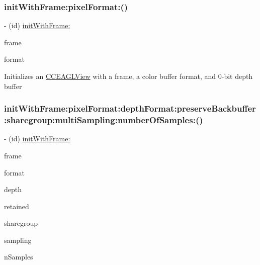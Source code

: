 \subsubsection{\texorpdfstring{init\+With\+Frame\+:pixel\+Format\+:()}{initWithFrame:pixelFormat:()}\hspace{0.1cm}{\footnotesize\ttfamily [2/2]}}
{\footnotesize\ttfamily -\/ (id) \hyperlink{interfaceCCEAGLView_a7d569f8fad8006eaa02d9b60f3877e43}{init\+With\+Frame\+:} \begin{DoxyParamCaption}\item[{(C\+G\+Rect)}]{frame }\item[{pixelFormat:(N\+S\+String $\ast$)}]{format }\end{DoxyParamCaption}}

Initializes an \hyperlink{interfaceCCEAGLView}{C\+C\+E\+A\+G\+L\+View} with a frame, a color buffer format, and 0-\/bit depth buffer \mbox{\label{interfaceCCEAGLView_adaca2cf585c2dc4881a07bc78a0fad61}} 
\subsubsection{\texorpdfstring{init\+With\+Frame\+:pixel\+Format\+:depth\+Format\+:preserve\+Backbuffer\+:sharegroup\+:multi\+Sampling\+:number\+Of\+Samples\+:()}{initWithFrame:pixelFormat:depthFormat:preserveBackbuffer:sharegroup:multiSampling:numberOfSamples:()}\hspace{0.1cm}{\footnotesize\ttfamily [1/2]}}
{\footnotesize\ttfamily -\/ (id) \hyperlink{interfaceCCEAGLView_a7d569f8fad8006eaa02d9b60f3877e43}{init\+With\+Frame\+:} \begin{DoxyParamCaption}\item[{(C\+G\+Rect)}]{frame }\item[{pixelFormat:(N\+S\+String$\ast$)}]{format }\item[{depthFormat:(G\+Luint)}]{depth }\item[{preserveBackbuffer:(B\+O\+OL)}]{retained }\item[{sharegroup:(E\+A\+G\+L\+Sharegroup$\ast$)}]{sharegroup }\item[{multiSampling:(B\+O\+OL)}]{sampling }\item[{numberOfSamples:(unsigned int)}]{n\+Samples }\end{DoxyParamCaption}}

